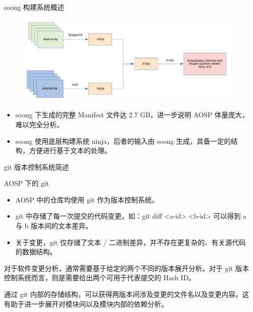    \begin{frame}{soong 构建系统概述}
        \begin{figure}
            \centering
            \includegraphics[width=.8\textwidth]{contents/figure/soong.png}
            \label{fig:soong}
        \end{figure}

        \begin{itemize}
            \item \small soong 下生成的完整 Manifest 文件达 2.7 GB，进一步说明 AOSP 体量庞大，难以完全分析。
            \item \small soong 使用底层构建系统 ninja，后者的输入由 soong 生成，具备一定的结构，方便进行基于文本的处理。
        \end{itemize}
    \end{frame}

    \begin{frame}{git 版本控制系统简述}
        \begin{block}{AOSP 下的 git}
            \begin{itemize}
                \item AOSP 中的仓库均使用 git 作为版本控制系统。
                \item git 中存储了每一次提交的代码变更。如：git diff <a-id> <b-id> 可以得到 a 与 b 版本间的文本差异。
                \item 关于变更，git 仅存储了文本 / 二进制差异，并不存在更复杂的、有关源代码的数据结构。
            \end{itemize}
        \end{block}

        \small 对于软件变更分析，通常需要基于给定的两个不同的版本展开分析。对于 git 版本控制系统而言，则是需要给出两个可用于代表提交的 Hash ID。

        \small 通过 git 内部的存储结构，可以获得两版本间涉及变更的文件名以及变更内容。这有助于进一步展开对模块间以及模块内部的依赖分析。
    \end{frame}

